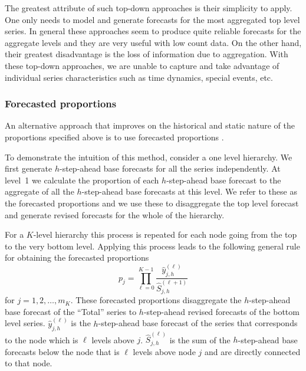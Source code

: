 \documentclass[nojss]{jss}
\begin{document}
The greatest attribute of such top-down approaches is their simplicity to apply. One only needs to model and generate forecasts for the most aggregated top level series. In general these approaches seem to produce quite reliable forecasts for the aggregate levels and they are very useful with low count data. On the other hand, their greatest disadvantage is the loss of information due to aggregation. With these top-down approaches, we are unable to capture and take advantage of individual series characteristics such as time dynamics, special events, etc.

\subsubsection{Forecasted proportions}

An alternative approach that improves on the historical and static nature of the proportions specified above is to use forecasted proportions \citep{GAH09}.

To demonstrate the intuition of this method, consider a one level hierarchy. We first generate $h$-step-ahead base forecasts for all the series independently. At level~1 we calculate the proportion of each $h$-step-ahead base forecast to the aggregate of all the $h$-step-ahead base forecasts at this level. We refer to these as the forecasted proportions and we use these to disaggregate the top level forecast and generate revised forecasts for the whole of the hierarchy.

For a $K$-level hierarchy this process is repeated for each node going from the top to the very bottom level. Applying this process leads to the following general rule for obtaining the forecasted proportions
$$ %
p_j=\prod^{K-1}_{\ell=0}\frac{\hat{y}_{j,h}^{(\ell)}}{\hat{S}_{j,h}^{(\ell+1)}}
$$
for $j=1,2,\dots,m_K$. These forecasted proportions disaggregate the $h$-step-ahead base forecast of the ``Total'' series to $h$-step-ahead revised forecasts of the bottom level series. $\hat{y}_{j,h}^{(\ell)}$ is the $h$-step-ahead base forecast of the series that corresponds to the node which is $\ell$ levels above $j$. $\hat{S}_{j,h}^{(\ell)}$ is the sum of the $h$-step-ahead base forecasts below the node that is $\ell$ levels above node $j$ and are directly connected to that node.
\end{document}
